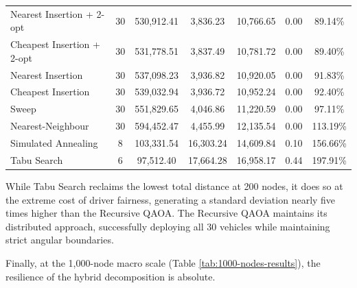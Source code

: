 \documentclass[a4paper]{report}
\begin{document}
{\begin{itemize}
\begin{itemize}
\begin{table}[H]
{\begin{tabular}{lcccccc}
Nearest Insertion + 2-opt & 30 & 530,912.41 & 3,836.23 & 10,766.65 & 0.00 & 89.14\% \\
Cheapest Insertion + 2-opt & 30 & 531,778.51 & 3,837.49 & 10,781.72 & 0.00 & 89.40\% \\
Nearest Insertion & 30 & 537,098.23 & 3,936.82 & 10,920.05 & 0.00 & 91.83\% \\
Cheapest Insertion & 30 & 539,032.94 & 3,936.72 & 10,952.24 & 0.00 & 92.40\% \\
Sweep & 30 & 551,829.65 & 4,046.86 & 11,220.59 & 0.00 & 97.11\% \\
Nearest-Neighbour & 30 & 594,452.47 & 4,455.99 & 12,135.54 & 0.00 & 113.19\% \\ 
\midrule
Simulated Annealing & 8 & 103,331.54 & 16,303.24 & 14,609.84 & 0.10 & 156.66\% \\
Tabu Search & 6 & 97,512.40 & 17,664.28 & 16,958.17 & 0.44 & 197.91\% \\
\bottomrule
\end{tabular}
}
\end{table}

While Tabu Search reclaims the lowest total distance at 200 nodes, it does so at the extreme cost of driver fairness, generating a standard deviation nearly five times higher than the Recursive QAOA. The Recursive QAOA maintains its distributed approach, successfully deploying all 30 vehicles while maintaining strict angular boundaries.

Finally, at the 1,000-node macro scale (Table \ref{tab:1000-nodes-results}), the resilience of the hybrid decomposition is absolute. 


\end{itemize}
\end{itemize}}
\end{document}
